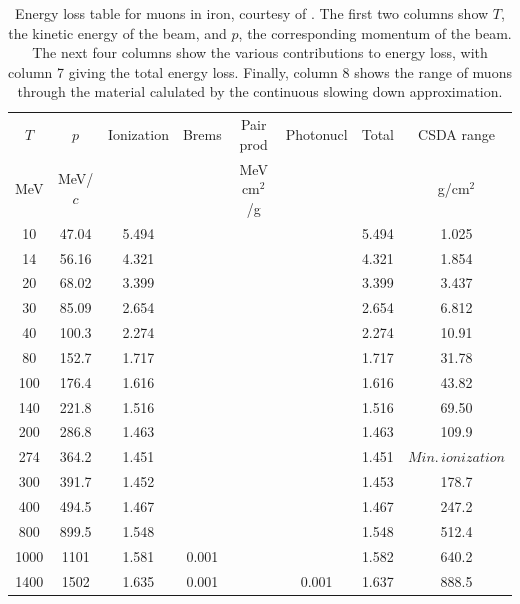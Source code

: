 \begin{table}
\caption[Energy loss table for muons in iron.]{Energy loss table for muons in iron, courtesy of \cite{PDGTables}. The first two columns show $T$, the kinetic energy of the beam, and $p$, the corresponding momentum of the beam. The next four columns show the various contributions to energy loss, with column 7 giving the total energy loss. Finally, column 8 shows the range of muons through the material calulated by the continuous slowing down approximation.}
\begin{tabularx}{\textwidth}{cccccccc}
\hline \hline
$T$ & $p$ & Ionization & Brems & Pair prod & Photonucl & Total & CSDA range\vspace{-12pt}\\
MeV & MeV/$c$ & \multicolumn{2}{c}{\sout{\hspace{3cm}}} & MeV cm$^2$/g & \multicolumn{2}{c}{\sout{\hspace{3cm}}} & g/cm$^2$\\ \hline
10 & 47.04 & 5.494 & &&& 5.494 & 1.025\vspace{-12pt}\\
14 & 56.16 & 4.321 & & & & 4.321 & 1.854\vspace{-12pt}\\
20 & 68.02 & 3.399 &  &   &  			& 3.399 & 3.437 \vspace{-12pt}\\
30 & 85.09 & 2.654 &  &  &  			& 2.654 & 6.812 \vspace{-12pt}\\
40 & 100.3 & 2.274 &  &  &  			& 2.274 & 10.91 \vspace{-12pt}\\
80 & 152.7 & 1.717 &  &  &  			& 1.717 & 31.78 \vspace{-12pt}\\
100 & 176.4 & 1.616 & &   &  			& 1.616 & 43.82 \vspace{-12pt}\\
140 & 221.8 & 1.516 & &   &  			& 1.516 & 69.50 \vspace{-12pt}\\
200 & 286.8 & 1.463 & &   &  			& 1.463 & 109.9 \vspace{-12pt}\\
274 & 364.2 & 1.451 & &   &  			& 1.451 & $Min.\, ionization$ \vspace{-12pt}\\
300 & 391.7 & 1.452 & &   &  			& 1.453 & 178.7 \vspace{-12pt}\\
400 & 494.5 & 1.467 & &   &  			& 1.467 & 247.2 \vspace{-12pt}\\
800 & 899.5 & 1.548 & &   &  			& 1.548 & 512.4 \vspace{-12pt}\\
1000 & 1101 & 1.581  & 0.001 & &  		& 1.582 & 640.2 \vspace{-12pt}\\
1400 & 1502 & 1.635  & 0.001 & & 0.001 	& 1.637 & 888.5\\
\hline
\end{tabularx}
\label{tbl:elossfe}
\end{table}

